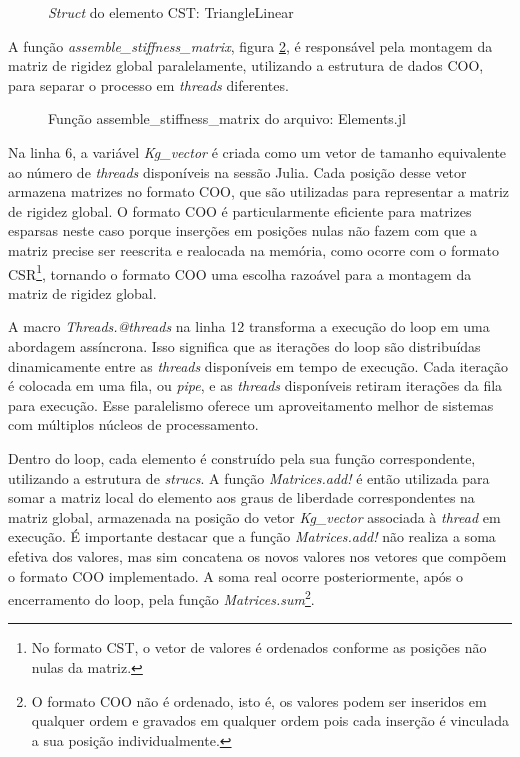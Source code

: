 \begin{figure}[hbtp]
    \caption{\emph{Struct} do elemento CST: TriangleLinear}
    
    \label{fig:TriangleLinear}
\end{figure}

A função \emph{assemble\_stiffness\_matrix}, figura \ref{fig:asm}, é responsável pela montagem da matriz de rigidez global paralelamente, utilizando a estrutura de dados COO, para separar o processo em \emph{threads} diferentes.    

\begin{figure}[hbtp!]
    \caption{Função assemble\_stiffness\_matrix do arquivo: Elements.jl}
    
    \label{fig:asm}
\end{figure}

Na linha 6, a variável \emph{Kg\_vector} é criada como um vetor de tamanho equivalente ao número de \emph{threads} disponíveis na sessão Julia. Cada posição desse vetor armazena matrizes no formato COO, que são utilizadas para representar a matriz de rigidez global. O formato COO é particularmente eficiente para matrizes esparsas neste caso porque inserções em posições nulas não fazem com que a matriz precise ser reescrita e realocada na memória, como ocorre com o formato CSR\footnote{No formato CST, o vetor de valores é ordenados conforme as posições não nulas da matriz.}, tornando o formato COO uma escolha razoável para a montagem da matriz de rigidez global.

A macro \emph{Threads.@threads} na linha 12 transforma a execução do loop em uma abordagem assíncrona. Isso significa que as iterações do loop são distribuídas dinamicamente entre as \emph{threads} disponíveis em tempo de execução. Cada iteração é colocada em uma fila, ou \emph{pipe}, e as \emph{threads} disponíveis retiram iterações da fila para execução. Esse paralelismo oferece um aproveitamento melhor de sistemas com múltiplos núcleos de processamento.

Dentro do loop, cada elemento é construído pela sua função correspondente, utilizando a estrutura de \emph{strucs}. A função \emph{Matrices.add!} é então utilizada para somar a matriz local do elemento aos graus de liberdade correspondentes na matriz global, armazenada na posição do vetor \emph{Kg\_vector} associada à \emph{thread} em execução. É importante destacar que a função \emph{Matrices.add!} não realiza a soma efetiva dos valores, mas sim concatena os novos valores nos vetores que compõem o formato COO implementado. A soma real ocorre posteriormente, após o encerramento do loop, pela função \emph{Matrices.sum}\footnote{O formato COO não é ordenado, isto é, os valores podem ser inseridos em qualquer ordem e gravados em qualquer ordem pois cada inserção é vinculada a sua posição individualmente.}.


